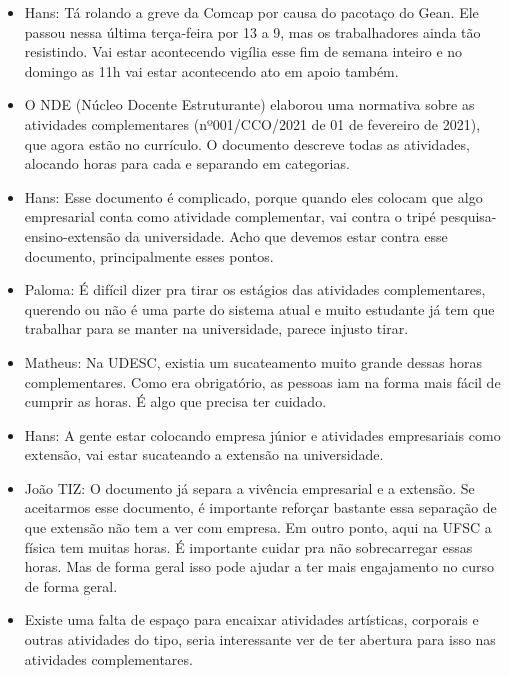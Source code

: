 \documentclass{ata-calico}
\begin{document}
\maketitle

\begin{itemize}
\item Hans: Tá rolando a greve da Comcap por causa do pacotaço do Gean. Ele passou nessa última terça-feira por 13 a 9, mas os trabalhadores ainda tão resistindo. Vai estar acontecendo vigília esse fim de semana inteiro e no domingo as 11h vai estar acontecendo ato em apoio também.
\end{itemize}

\begin{itemize}
\item O NDE (Núcleo Docente Estruturante) elaborou uma normativa sobre as atividades complementares (nº001/CCO/2021 de 01 de fevereiro de 2021), que agora estão no currículo. O documento descreve todas as atividades, alocando horas para cada e separando em categorias.
\item Hans: Esse documento é complicado, porque quando eles colocam que algo empresarial conta como atividade complementar, vai contra o tripé pesquisa-ensino-extensão da universidade. Acho que devemos estar contra esse documento, principalmente esses pontos.
\item Paloma: É difícil dizer pra tirar os estágios das atividades complementares, querendo ou não é uma parte do sistema atual e muito estudante já tem que trabalhar para se manter na universidade, parece injusto tirar.
\item Matheus: Na UDESC, existia um sucateamento muito grande dessas horas complementares. Como era obrigatório, as pessoas iam na forma mais fácil de cumprir as horas. É algo que precisa ter cuidado.
\item Hans: A gente estar colocando empresa júnior e atividades empresariais como extensão, vai estar sucateando a extensão na universidade.
\item João TIZ: O documento já separa a vivência empresarial e a extensão. Se aceitarmos esse documento, é importante reforçar bastante essa separação de que extensão não tem a ver com empresa. Em outro ponto, aqui na UFSC a física tem muitas horas. É importante cuidar pra não sobrecarregar essas horas. Mas de forma geral isso pode ajudar a ter mais engajamento no curso de forma geral.
\item Existe uma falta de espaço para encaixar atividades artísticas, corporais e outras atividades do tipo, seria interessante ver de ter abertura para isso nas atividades complementares.

\end{itemize}
\end{document}
